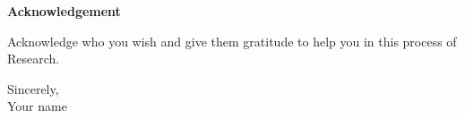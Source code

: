 \begin{center}
    \fontsize{20pt}{25pt}\selectfont
    \textbf{Acknowledgement}
\end{center}

\vspace{1.5cm}

Acknowledge who you wish and give them gratitude to help you in this process of Research.

\vspace{2cm}

\parbox[t]{\textwidth}{
	\raggedleft %
	Sincerely, \\
	Your name
}